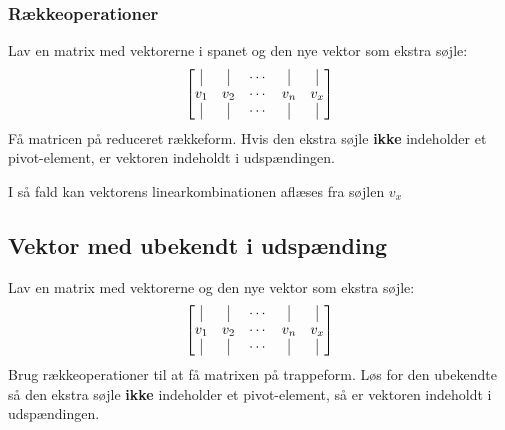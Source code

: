 \subsubsection{Rækkeoperationer}
Lav en matrix med vektorerne i spanet og den nye vektor som ekstra søjle:
\[
    \begin{bmatrix}
        \vline & \vline & \cdots & \vline & \vline \\
        v_1 & v_2 & \cdots & v_n & v_x \\
        \vline & \vline & \cdots & \vline & \vline \\
    \end{bmatrix}
\]
Få matricen på reduceret rækkeform. Hvis den ekstra søjle \textbf{ikke} indeholder et pivot-element, er vektoren indeholdt i udspændingen.

I så fald kan vektorens linearkombinationen aflæses fra søjlen $v_x$



\subsection{Vektor med ubekendt i udspænding}
Lav en matrix med vektorerne og den nye vektor som ekstra søjle:
\[
    \begin{bmatrix}
        \vline & \vline & \cdots & \vline & \vline \\
        v_1 & v_2 & \cdots & v_n & v_x \\
        \vline & \vline & \cdots & \vline & \vline \\
    \end{bmatrix}
\]
Brug rækkeoperationer til at få matrixen på trappeform. Løs for den ubekendte så den ekstra søjle \textbf{ikke} indeholder et pivot-element, så er vektoren indeholdt i udspændingen.

